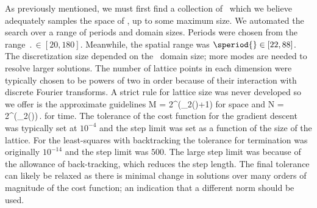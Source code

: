 As previously mentioned, we must first find a collection of \twots\ which we believe
adequately samples the space of \twots, up to some maximum size. We automated the search over a range
of periods and domain sizes. Periods were chosen from the range
$\period{}\in [20, 180]$. Meanwhile, the spatial range was $\speriod{} \in [22, 88]$. The discretization size
depended on the \spt\ domain size; more modes are needed to resolve larger solutions. The number
of lattice points in each dimension were typically chosen to be powers of two in order because of their interaction with discrete Fourier transforms. A strict rule for lattice size
was never developed so we offer is the approximate guidelines
\beq
M = 2^{(\log_2(\speriod{})+1)}
\eeq
for space and
\beq
N = 2^{(\log_2(\period{}))}\,.
\eeq
for time.
The tolerance of the cost function for the gradient descent was typically set at $10^{-4}$
and the step limit was set as a function of the size of the lattice. For the least-squares
with backtracking the tolerance for termination was originally $10^{-14}$ and the step limit was $500$. The large step limit was because of
the allowance of back-tracking, which reduces the step length.
The final tolerance can likely be relaxed as there is minimal change in solutions over many orders
of magnitude of the cost function; an indication that a different norm should be used.



